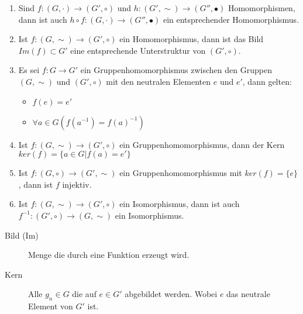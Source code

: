 \begin{enumerate}
	\item Sind $f: (G, \cdot) \rightarrow (G', \circ)$ und $h: (G', \sim) \rightarrow (G'', \bullet)$ Homomorphismen, dann ist auch $h \circ f: (G, \cdot) \rightarrow (G'', \bullet)$ ein entsprechender Homomorphismus.
	\item Ist $f: (G, \sim) \rightarrow (G', \circ)$ ein Homomorphismus, dann ist das Bild $Im(f) \subset G'$ eine entsprechende Unterstruktur von $(G', \circ).$
	\item Es sei $f: G \rightarrow G'$ ein Gruppenhomomorphismus zwischen den Gruppen $(G, \sim)$ und $(G', \circ)$ mit den neutralen Elementen $e$ und $e'$, dann gelten:
	\begin{itemize}
		\item $f(e) = e'$
		\item $\forall a \in G(f(a^{-1}) = f(a)^{-1})$
	\end{itemize}
	\item Ist $f: (G, \sim) \rightarrow (G', \circ)$ ein Gruppenhomomorphismus, dann der Kern $ker(f) = \{a \in G | f(a) = e'\}$
	\item Ist $f: (G, \circ) \rightarrow (G', \sim)$ ein Gruppenhomomorphismus mit $ker(f) = \{e\}$,
	dann ist $f$ injektiv.
	\item Ist $f: (G, \sim) \rightarrow (G', \circ)$ ein Isomorphismus, dann ist auch $f^{-1}: (G', \circ) \rightarrow (G, \sim)$ ein Isomorphismus.
\end{enumerate}

\begin{description}
	\item [Bild (Im)] Menge die durch eine Funktion erzeugt wird.
	\item [Kern] Alle $g_n \in G$ die auf $e \in G'$ abgebildet werden. Wobei $e$ das neutrale Element von $G'$ ist.
\end{description}

